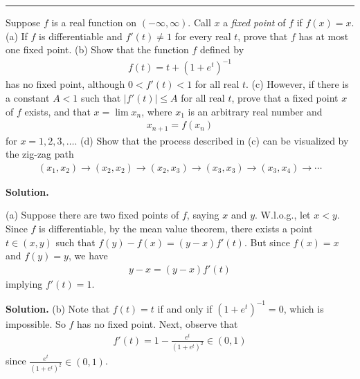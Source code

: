 \documentclass[12pt]{article}
\theoremstyle{definition}
\begin{document}
\bigskip\noindent\hrule\bigskip

Suppose $f$ is a real function on $(-\infty,\infty)$. Call $x$ a \textit{fixed point} of $f$ if $f(x)=x$.
(a) If $f$ is differentiable and $f'(t)\ne 1$ for every real $t$, prove that $f$ has at most one fixed point.
(b) Show that the function $f$ defined by
\begin{align*}
f(t)=t+(1+e^t)^{-1}
\end{align*}
has no fixed point, although $0<f'(t)<1$ for all real $t$.
(c) However, if there is a constant $A<1$ such that $\left\vert f'(t)\right\vert\le A$ for all real $t$, prove that a fixed point $x$ of $f$ exists, and that $x=\lim x_n$, where $x_1$ is an arbitrary real number and
\begin{align*}
x_{n+1}=f(x_n)
\end{align*}
for $x=1,2,3,\ldots$.
(d) Show that the process described in (c) can be visualized by the zig-zag path
\begin{align*}
(x_1,x_2)\to(x_2,x_2)\to(x_2,x_3)\to(x_3,x_3)\to(x_3,x_4)\to\cdots
\end{align*}

\smallskip
\noindent\textbf{Solution.}\quad

(a) Suppose there are two fixed points of $f$, saying $x$ and $y$. W.l.o.g., let $x<y$. Since $f$ is differentiable, by the mean value theorem, there exists a point $t\in(x,y)$ such that $f(y)-f(x)=(y-x)f'(t)$. But since $f(x)=x$ and $f(y)=y$, we have
\begin{align*}
y-x
=(y-x)f'(t)
\end{align*}
implying $f'(t)=1$.

\smallskip
\noindent\textbf{Solution.}\quad
(b) Note that $f(t)=t$ if and only if $(1+e^t)^{-1}=0$, which is impossible. So $f$ has no fixed point. Next, observe that
\begin{align*}
f'(t)=1-\frac{e^t}{(1+e^t)^{2}}\in(0,1)
\end{align*}
since $\frac{e^t}{(1+e^t)^{2}}\in(0,1)$.
\end{document}

